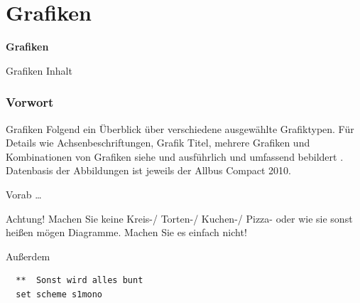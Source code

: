 

\part{Grafiken}
\begin{frame}
\thispagestyle{empty}
\textbf{\huge{Grafiken}}
\end{frame}

\begin{frame}{Grafiken Inhalt}
 \tableofcontents
\end{frame}


\section{Vorwort}
\begin{frame}{Grafiken}
 Folgend ein Überblick über verschiedene ausgewählte Grafiktypen. Für Details wie Achsenbeschriftungen, Grafik Titel, mehrere Grafiken und Kombinationen von Grafiken siehe \textcite[Kap. 6]{Kohler2012} und ausführlich und umfassend bebildert \textcite{Mitchell2012}.\\
 Datenbasis der Abbildungen ist jeweils der Allbus Compact 2010.
\end{frame}

\begin{frame}[fragile]{Vorab \dots}
\begin{alertblock}{Achtung!}
Machen Sie keine Kreis-/ Torten-/ Kuchen-/ Pizza- oder wie sie sonst heißen mögen Diagramme. Machen Sie es einfach nicht!
\end{alertblock}
\end{frame}

\begin{frame}[fragile]{Außerdem}  
  \begin{lstlisting}
  **  Sonst wird alles bunt
  set scheme s1mono
 \end{lstlisting}
\end{frame}

